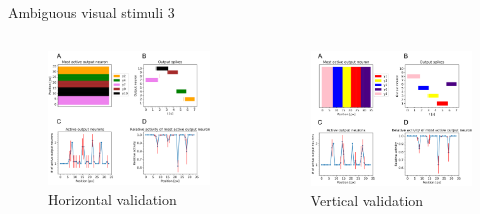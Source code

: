 \documentclass[aspectratio=169]{beamer}
\begin{document}
\begin{frame}{Ambiguous visual stimuli 3}
   \begin{columns}[onlytextwidth]
	\begin{column}{0.5\textwidth}
	        \begin{figure}
        \includegraphics[width=0.7\linewidth]{../Latex/figures/horvertAdaptiveInh/horizontal_validation.png}
      \\   \scriptsize Horizontal validation
      \end{figure} 
	\end{column}
	\begin{column}{0.5\textwidth}
		        \begin{figure}
        \includegraphics[width=0.7\linewidth]{../Latex/figures/horvertAdaptiveInh/vertical_validation.png}
      \\   \scriptsize Vertical validation
      \end{figure} 
	\end{column}
  \end{columns}
\end{frame}
\end{document}
